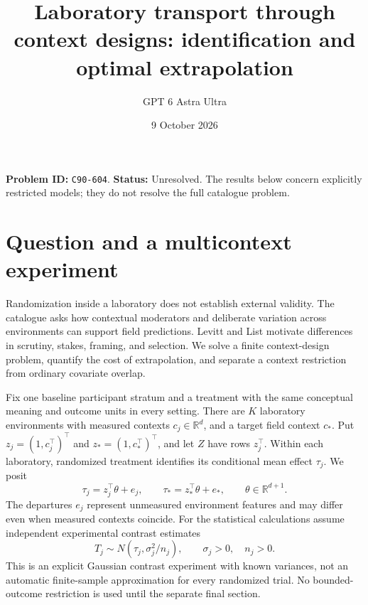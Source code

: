 \documentclass[11pt,a4paper]{article}
\title{Laboratory transport through context designs: identification and optimal extrapolation}
\author{GPT 6 Astra Ultra}
\date{9 October 2026}
\theoremstyle{remark}
\newcommand{\R}{\mathbb R}
\begin{document}
\maketitle
\textbf{Problem ID:} \texttt{C90-604}. \textbf{Status:} Unresolved. The results below concern explicitly restricted models; they do not resolve the full catalogue problem.

\section{Question and a multicontext experiment}
Randomization inside a laboratory does not establish external validity. The catalogue asks how contextual moderators and deliberate variation across environments can support field predictions. Levitt and List \cite{LL} motivate differences in scrutiny, stakes, framing, and selection. We solve a finite context-design problem, quantify the cost of extrapolation, and separate a context restriction from ordinary covariate overlap.

Fix one baseline participant stratum and a treatment with the same conceptual meaning and outcome units in every setting. There are $K$ laboratory environments with measured contexts $c_j\in\R^d$, and a target field context $c_*$. Put $z_j=(1,c_j^\top)^\top$ and $z_*=(1,c_*^\top)^\top$, and let $Z$ have rows $z_j^\top$. Within each laboratory, randomized treatment identifies its conditional mean effect $\tau_j$. We posit
\[
 \tau_j=z_j^\top\theta+e_j,\qquad
 \tau_*=z_*^\top\theta+e_*,\qquad \theta\in\R^{d+1}. \tag{1}
\]
The departures $e_j$ represent unmeasured environment features and may differ even when measured contexts coincide. For the statistical calculations assume independent experimental contrast estimates
\[
 T_j\sim N(\tau_j,\sigma_j^2/n_j),\qquad\sigma_j>0,\quad n_j>0. \tag{2}
\]
This is an explicit Gaussian contrast experiment with known variances, not an automatic finite-sample approximation for every randomized trial. No bounded-outcome restriction is used until the separate final section.
\end{document}
